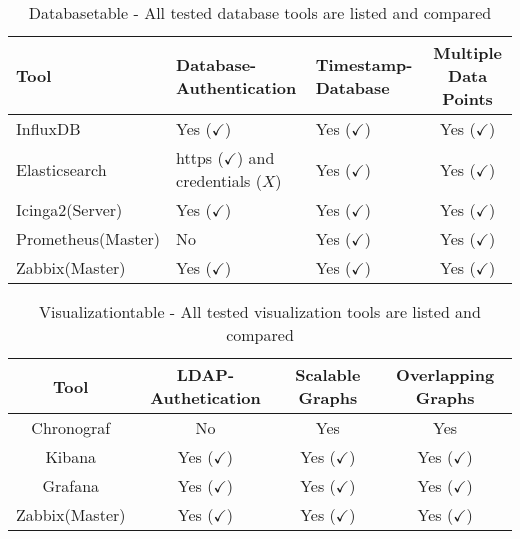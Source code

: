 \begin{table}
\centering

\begin{tabular}{p{3cm}p{3cm}p{3cm}c}
	\hline
Tool & Database-Authentication     & Timestamp-Database          & Multiple Data Points        \\
\hline
InfluxDB  & Yes ($ \checkmark $) & Yes ($ \checkmark $)  & Yes ($ \checkmark $)\\
Elasticsearch & https ($ \checkmark $) and credentials ($ X $) & Yes ($ \checkmark $) & Yes ($ \checkmark $)\\
Icinga2(Server) & Yes ($ \checkmark $) & Yes ($ \checkmark $) & Yes ($ \checkmark $) \\
Prometheus(Master)& No & Yes ($ \checkmark $) & Yes ($ \checkmark $)\\
Zabbix(Master)& Yes ($ \checkmark $) & Yes ($ \checkmark $) & Yes ($ \checkmark $)\\
\hline
\end{tabular}
\caption{Databasetable - All tested database tools are listed and compared}
\label{tab:Database}
\end{table}

\begin{table} 
\centering

\begin{tabular}{cccc}
	\hline
Tool & LDAP-Authetication         & Scalable Graphs             & Overlapping Graphs          \\
\hline
Chronograf & No & Yes & Yes \\
Kibana & Yes ($ \checkmark $) & Yes ($ \checkmark $) & Yes ($ \checkmark $)\\
Grafana & Yes ($ \checkmark $) & Yes ($ \checkmark $) & Yes ($ \checkmark $)\\
Zabbix(Master) & Yes ($ \checkmark $) & Yes ($ \checkmark $)  & Yes  ($ \checkmark $)\\
\hline
\end{tabular}
\caption{Visualizationtable - All tested visualization tools are listed and compared}
\label{tab:Visualization}
\end{table}

